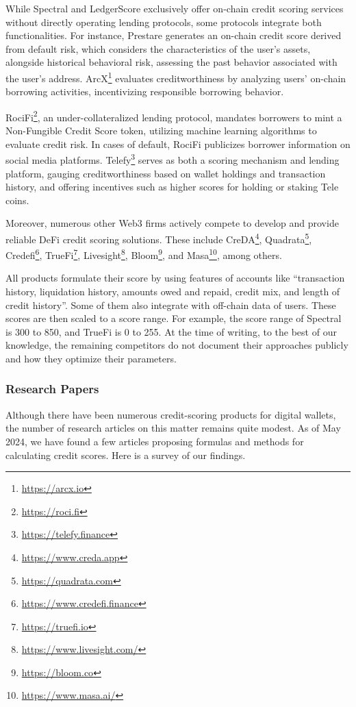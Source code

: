 \documentclass[../ICIT-Paper-2024.tex]{subfiles}
\begin{document}
While Spectral and LedgerScore exclusively offer on-chain credit scoring services without directly operating lending protocols, some protocols integrate both functionalities. For instance, Prestare generates an on-chain credit score derived from default risk, which considers the characteristics of the user's assets, alongside historical behavioral risk, assessing the past behavior associated with the user's address. ArcX\footnote{\href{https://arcx.io/}{https://arcx.io}} evaluates creditworthiness by analyzing users' on-chain borrowing activities, incentivizing responsible borrowing behavior. 

RociFi\footnote{\href{https://roci.fi/}{https://roci.fi}}, an under-collateralized lending protocol, mandates borrowers to mint a Non-Fungible Credit Score token, utilizing machine learning algorithms to evaluate credit risk. In cases of default, RociFi publicizes borrower information on social media platforms. Telefy\footnote{\href{https://telefy.finance/\#/}{https://telefy.finance}} serves as both a scoring mechanism and lending platform, gauging creditworthiness based on wallet holdings and transaction history, and offering incentives such as higher scores for holding or staking Tele coins.

Moreover, numerous other Web3 firms actively compete to develop and provide reliable DeFi credit scoring solutions. These include CreDA\footnote{\href{https://www.creda.app/home}{https://www.creda.app}}, Quadrata\footnote{\href{https://quadrata.com/}{https://quadrata.com}}, Credefi\footnote{\href{https://www.credefi.finance/}{https://www.credefi.finance}}, TrueFi\footnote{\href{https://truefi.io/}{https://truefi.io}}, Livesight\footnote{\href{https://www.livesight.com/}{https://www.livesight.com/}}, Bloom\footnote{\href{https://bloom.co/}{https://bloom.co}}, and Masa\footnote{\href{https://www.masa.ai/}{https://www.masa.ai/}}, among others.

All products formulate their score by using features of accounts like “transaction history, liquidation history, amounts owed and repaid, credit mix, and length of credit history”. Some of them also integrate with off-chain data of users. These scores are then scaled to a score range. For example, the score range of Spectral is 300 to 850, and TrueFi is 0 to 255.  At the time of writing, to the best of our knowledge, the remaining competitors do not document their approaches publicly and how they optimize their parameters.

\subsubsection{Research Papers}
Although there have been numerous credit-scoring products for digital wallets, the number of research articles on this matter remains quite modest. As of May 2024, we have found a few articles proposing formulas and methods for calculating credit scores. Here is a survey of our findings.
\end{document}
